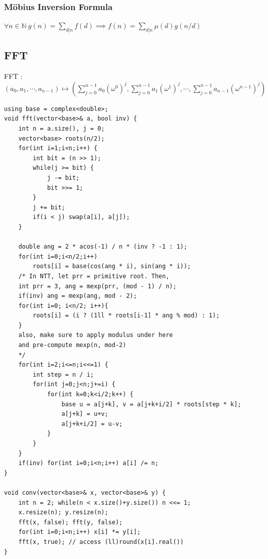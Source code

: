 \documentclass[landscape, 8pt, a4paper, oneside, twocolumn]{extarticle}
\begin{document}
\subsubsection{M\"obius Inversion Formula}
$ \forall n \in \mathbb{N}\ g(n) = \sum_{d|n} f(d) \implies f(n) = \sum_{d|n} \mu(d) g(n/d) $
\subsection{FFT}
FFT : $
(a_0, a_1, \cdots, a_{n-1}) \mapsto (\sum_{j=0}^{n-1}a_0 (\omega^0)^j, \sum_{j=0}^{n-1}a_1 (\omega^1)^j, \cdots, \sum_{j=0}^{n-1}a_{n-1} (\omega^{n-1})^j)
$
\begin{verbatim}
using base = complex<double>;
void fft(vector<base>& a, bool inv) {
    int n = a.size(), j = 0;
    vector<base> roots(n/2);
    for(int i=1;i<n;i++) {
        int bit = (n >> 1);
        while(j >= bit) {
            j -= bit;
            bit >>= 1;
        }
        j += bit;
        if(i < j) swap(a[i], a[j]);
    }

    double ang = 2 * acos(-1) / n * (inv ? -1 : 1);
    for(int i=0;i<n/2;i++)
        roots[i] = base(cos(ang * i), sin(ang * i));
    /* In NTT, let prr = primitive root. Then,
    int prr = 3, ang = mexp(prr, (mod - 1) / n);
    if(inv) ang = mexp(ang, mod - 2);
    for(int i=0; i<n/2; i++){
        roots[i] = (i ? (1ll * roots[i-1] * ang % mod) : 1);
    }
    also, make sure to apply modulus under here
    and pre-compute mexp(n, mod-2)
    */
    for(int i=2;i<=n;i<<=1) {
        int step = n / i;
        for(int j=0;j<n;j+=i) {
            for(int k=0;k<i/2;k++) {
                base u = a[j+k], v = a[j+k+i/2] * roots[step * k];
                a[j+k] = u+v;
                a[j+k+i/2] = u-v;
            }
        }
    }
    if(inv) for(int i=0;i<n;i++) a[i] /= n;
}

void conv(vector<base>& x, vector<base>& y) {
    int n = 2; while(n < x.size()+y.size()) n <<= 1;
    x.resize(n); y.resize(n);
    fft(x, false); fft(y, false);
    for(int i=0;i<n;i++) x[i] *= y[i];
    fft(x, true); // access (ll)round(x[i].real())
}
\end{verbatim}
\end{document}
